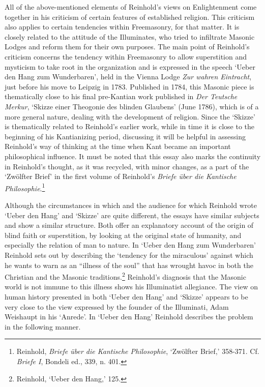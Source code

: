 All of the above{-}mentioned elements of Reinhold's views on Enlightenment come together in his criticism of certain features of established religion. This criticism also applies to certain tendencies within Freemasonry, for that matter. It is closely related to the attitude of the Illuminates, who tried to infiltrate Masonic Lodges and reform them for their own purposes. The main point of Reinhold's criticism concerns the tendency within Freemasonry to allow superstition and mysticism to take root in the organization and is expressed in the speech `Ueber den Hang zum Wunderbaren', held in the Vienna Lodge \textit{Zur wahren Eintracht}, just before his move to Leipzig in 1783. Published in 1784, this Masonic piece is thematically close to his final pre{-}Kantian work published in \textit{Der Teutsche Merkur}, `Skizze einer Theogonie des blinden Glaubens' (June 1786), which is of a more general nature, dealing with the development of religion. Since the `Skizze' is thematically related to Reinhold's earlier work, while in time it is close to the beginning of his Kantianizing period, discussing it will be helpful in assessing Reinhold's way of thinking at the time when Kant became an important philosophical influence. It must be noted that this essay also marks the continuity in Reinhold's thought, as it was recycled, with minor changes, as a part of the `Zw\"{o}lfter Brief' in the first volume of Reinhold's \textit{Briefe \"{u}ber die Kantische Philosophie}.\footnote{ Reinhold, \textit{Briefe \"{u}ber die Kantische Philosophie}, `Zw\"{o}lfter Brief,' 358{-}371. Cf. \textit{Briefe I}, Bondeli ed., 339, n. 401. } 

Although the circumstances in which and the audience for which Reinhold wrote `Ueber den Hang' and `Skizze' are quite different, the essays have similar subjects and show a similar structure. Both offer an explanatory account of the origin of blind faith or superstition, by looking at the original state of humanity, and especially the relation of man to nature. In `Ueber den Hang zum Wunderbaren' Reinhold sets out by describing the `tendency for the miraculous' against which he wants to warn as an ``illness of the soul'' that has wrought havoc in both the Christian and the Masonic traditions.\footnote{ Reinhold, `Ueber den Hang,' 125. } Reinhold's diagnosis that the Masonic world is not immune to this illness shows his Illuminatist allegiance. The view on human history presented in both `Ueber den Hang' and `Skizze' appears to be very close to the view expressed by the founder of the Illuminati, Adam Weishaupt in his `Anrede'. In `Ueber den Hang' Reinhold describes the problem in the following manner. 

